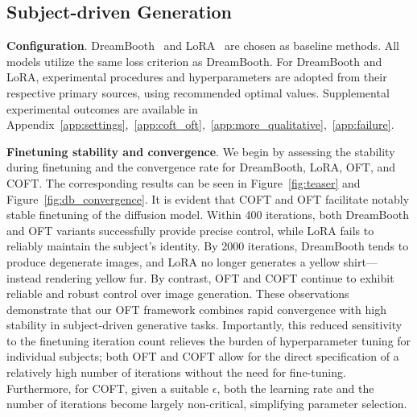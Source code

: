 \subsection{Subject-driven Generation}

\textbf{Configuration}. DreamBooth~\cite{ruiz2023dreambooth} and LoRA~\cite{hulora2022} are chosen as baseline methods. All models utilize the same loss criterion as DreamBooth. For DreamBooth and LoRA, experimental procedures and hyperparameters are adopted from their respective primary sources, using recommended optimal values. Supplemental experimental outcomes are available in Appendix~\ref{app:settings},~\ref{app:coft_oft},~\ref{app:more_qualitative},~\ref{app:failure}.

\textbf{Finetuning stability and convergence}. We begin by assessing the stability during finetuning and the convergence rate for DreamBooth, LoRA, OFT, and COFT. The corresponding results can be seen in Figure~\ref{fig:teaser} and Figure~\ref{fig:db_convergence}. It is evident that COFT and OFT facilitate notably stable finetuning of the diffusion model. Within 400 iterations, both DreamBooth and OFT variants successfully provide precise control, while LoRA fails to reliably maintain the subject’s identity. By 2000 iterations, DreamBooth tends to produce degenerate images, and LoRA no longer generates a yellow shirt—instead rendering yellow fur. By contrast, OFT and COFT continue to exhibit reliable and robust control over image generation. These observations demonstrate that our OFT framework combines rapid convergence with high stability in subject-driven generative tasks. Importantly, this reduced sensitivity to the finetuning iteration count relieves the burden of hyperparameter tuning for individual subjects; both OFT and COFT allow for the direct specification of a relatively high number of iterations without the need for fine-tuning. Furthermore, for COFT, given a suitable $\epsilon$, both the learning rate and the number of iterations become largely non-critical, simplifying parameter selection.

